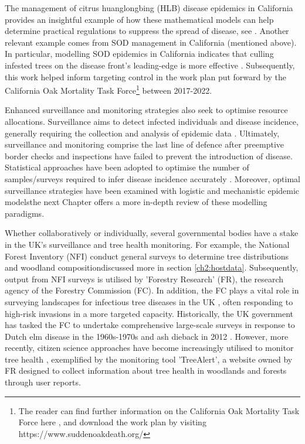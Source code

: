 The management of citrus huanglongbing (HLB) disease epidemics in California provides an insightful example of how these mathematical models can help determine practical regulations to suppress the spread of disease, see \cite{mcroberts2019using}. Another relevant example comes from SOD management in California (mentioned above).
In particular, modelling SOD epidemics in California indicates that culling infested trees on the disease front's leading-edge is more effective \cite{large-scale-control}. Subsequently, this work helped inform targeting control in the work plan put forward by the California Oak Mortality Task Force\footnote{The reader can find further information on the California Oak Mortality Task Force here \cite{palmieri2006california}, and download the work plan by visiting https://www.suddenoakdeath.org/} between 2017-2022.

Enhanced surveillance and monitoring strategies also seek to optimise resource allocations. 
Surveillance aims to detect infected individuals and disease incidence, generally requiring the collection and analysis of epidemic data \cite{surveillance-review}.
Ultimately, surveillance and monitoring comprise the last line of defence after preemptive border checks and inspections have failed to prevent the introduction of disease. 
Statistical approaches have been adopted to optimise the number of samples/surveys required to infer disease incidence accurately \cite{yamamura2016sampling}.
Moreover, optimal surveillance strategies have been examined with logistic \cite{parnell2012estimating} and mechanistic \cite{WEBIDEMICS} epidemic models\textemdash the next Chapter offers a more in-depth review of these modelling paradigms. 

Whether collaboratively or individually, several governmental bodies have a stake in the UK's surveillance and tree health monitoring. For example, the National Forest Inventory (NFI) conduct general surveys to determine tree distributions and woodland composition\textemdash discussed more in section \ref{ch2:hostdata}. Subsequently, output from NFI surveys is utilised by  'Forestry Research' (FR), the research agency of the Forestry Commission (FC). In addition, the FC plays a vital role in surveying landscapes for infectious tree diseases in the UK \cite{ryle1969forest, james1990history}, often responding to high-risk invasions in a more targeted capacity. Historically, the UK government has tasked the FC to undertake comprehensive large-scale surveys in response to Dutch elm disease in the 1960s-1970s \cite{potter2011learning} and ash dieback in 2012 \cite{tomlinson2016discovery}. 
However, more recently, citizen science approaches have become increasingly utilised to monitor tree health \cite{brown2020role}, exemplified by the monitoring tool 'TreeAlert', a website owned by FR designed to collect information about tree health in woodlands and forests through user reports.

